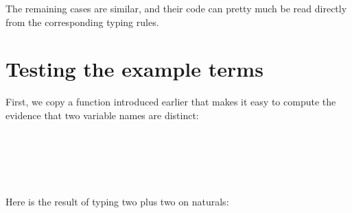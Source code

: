 The remaining cases are similar, and their code can pretty much be read
directly from the corresponding typing rules.

\hypertarget{testing-the-example-terms}{%
\section{Testing the example terms}\label{testing-the-example-terms}}

First, we copy a function introduced earlier that makes it easy to
compute the evidence that two variable names are distinct:

\begin{fence}
\begin{code}%
\>[0]\AgdaSpace{}%
\AgdaSymbol{:}\AgdaSpace{}%
\AgdaSpace{}%
\AgdaSymbol{(}\AgdaSpace{}%
\AgdaSpace{}%
\AgdaSymbol{:}\AgdaSpace{}%
\AgdaSymbol{)}\AgdaSpace{}%
\AgdaSpace{}%
\AgdaSpace{}%
\AgdaSpace{}%
\<%
\\
\>[0]\AgdaSpace{}%
\AgdaSpace{}%
%
\>[7]\AgdaSpace{}%
\AgdaSpace{}%
\AgdaSpace{}%
\<%
\\
\>[0]%
\>[10]\AgdaSymbol{|}\AgdaSpace{}%
%
\>[16]%
\>[21]\AgdaSymbol{=}%
\>[24]\<%
\\
\>[0]%
\>[10]\AgdaSymbol{|}\AgdaSpace{}%
\AgdaSpace{}%
\AgdaSymbol{\AgdaUnderscore{}}%
\>[21]\AgdaSymbol{=}%
\>[24]\AgdaSpace{}%
\<%
\\
\>[0][@{}l@{\AgdaIndent{0}}]%
\>[2]\AgdaSpace{}%
\AgdaSpace{}%
\AgdaSpace{}%
\AgdaSymbol{:}\AgdaSpace{}%
\<%
\end{code}
\end{fence}

Here is the result of typing two plus two on naturals:

